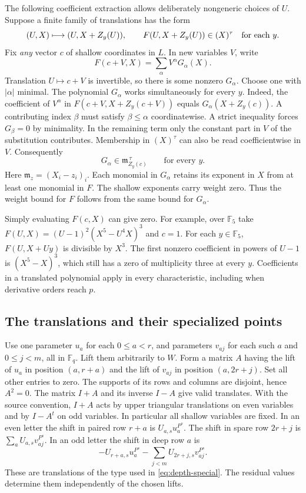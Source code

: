 \documentclass[11pt,letterpaper]{article}
\begin{document}
The following coefficient extraction allows deliberately nongeneric choices of $U$. Suppose a finite family of translations has the form
\[
 (U,X)\longmapsto (U,X+Z_y(U)), \qquad
 F(U,X+Z_y(U))\in (X)^\tau \quad\hbox{for each }y.
\]
Fix \emph{any} vector $c$ of shallow coordinates in $L$. In new variables $V$, write
\[
 F(c+V,X)=\sum_{\alpha} V^\alpha G_\alpha(X).
\]
Translation $U\mapsto c+V$ is invertible, so there is some nonzero $G_\alpha$. Choose one with $|\alpha|$ minimal. The polynomial $G_\alpha$ works simultaneously for every $y$. Indeed, the coefficient of $V^\alpha$ in $F(c+V,X+Z_y(c+V))$ equals $G_\alpha(X+Z_y(c))$. A contributing index $\beta$ must satisfy $\beta\leq\alpha$ coordinatewise. A strict inequality forces $G_\beta=0$ by minimality. In the remaining term only the constant part in $V$ of the substitution contributes. Membership in $(X)^\tau$ can also be read coefficientwise in $V$. Consequently
\begin{equation}
 G_\alpha\in\mathfrak m_{Z_y(c)}^{\,\tau}
 \qquad\text{for every }y.
 \label{eq:depth-special}
\end{equation}
Here $\mathfrak m_z=(X_i-z_i)_i$. Each monomial in $G_\alpha$ retains its exponent in $X$ from at least one monomial in $F$. The shallow exponents carry weight zero. Thus the weight bound for $F$ follows from the same bound for $G_\alpha$.

Simply evaluating $F(c,X)$ can give zero. For example, over $\mathbb F_5$ take $F(U,X)=(U-1)^2(X^5-U^4X)^3$ and $c=1$. For each $y\in\mathbb F_5$, $F(U,X+Uy)$ is divisible by $X^3$. The first nonzero coefficient in powers of $U-1$ is $(X^5-X)^3$, which still has a zero of multiplicity three at every $y$. Coefficients in a translated polynomial apply in every characteristic, including when derivative orders reach $p$.

\subsection{The translations and their specialized points}

Use one parameter $u_a$ for each $0\leq a<r$, and parameters $v_{aj}$ for each such $a$ and $0\leq j<m$, all in $\mathbb F_q$. Lift them arbitrarily to $W$. Form a matrix $A$ having the lift of $u_a$ in position $(a,r+a)$ and the lift of $v_{aj}$ in position $(a,2r+j)$. Set all other entries to zero. The supports of its rows and columns are disjoint, hence $A^2=0$. The matrix $I+A$ and its inverse $I-A$ give valid translates. With the source convention, $I+A$ acts by upper triangular translations on even variables and by $I-A^t$ on odd variables. In particular all shallow variables are fixed. In an even letter the shift in paired row $r+a$ is $U_{a,s}u_a^{P^s}$. The shift in spare row $2r+j$ is $\sum_a U_{a,s}v_{aj}^{P^s}$. In an odd letter the shift in deep row $a$ is
\[
 -U_{r+a,s}u_a^{P^s}-\sum_{j<m}U_{2r+j,s}v_{aj}^{P^s}.
\]
These are translations of the type used in \eqref{eq:depth-special}. The residual values determine them independently of the chosen lifts.
\end{document}
